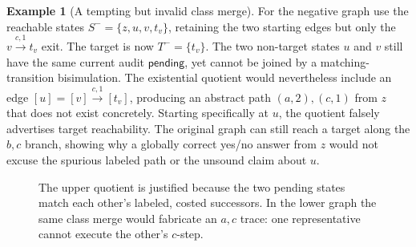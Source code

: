 \documentclass[11pt,letterpaper]{article}
\theoremstyle{definition}
\newtheorem{example}[theorem]{Example}
\begin{document}
\begin{example}[A tempting but invalid class merge]\label{ex:finite-negative}
For the negative graph use the reachable states $S^{-}=\{z,u,v,t_v\}$, retaining the two starting edges but only the $v\xrightarrow{c,1}t_v$ exit. The target is now $T^{-}=\{t_v\}$. The two non-target states $u$ and $v$ still have the same current audit $\mathsf{pending}$, yet cannot be joined by a matching-transition bisimulation. The existential quotient would nevertheless include an edge $[u]=[v]\xrightarrow{c,1}[t_v]$, producing an abstract path $(a,2),(c,1)$ from $z$ that does not exist concretely. Starting specifically at $u$, the quotient falsely advertises target reachability. The original graph can still reach a target along the $b,c$ branch, showing why a globally correct yes/no answer from $z$ would not excuse the spurious labeled path or the unsound claim about $u$.
\end{example}

\begin{figure}[htbp]\centering
{}
\caption{The upper quotient is justified because the two pending states match each other's labeled, costed successors. In the lower graph the same class merge would fabricate an $a,c$ trace: one representative cannot execute the other's $c$-step.}
\label{fig:finite-example}
\end{figure}
\end{document}
